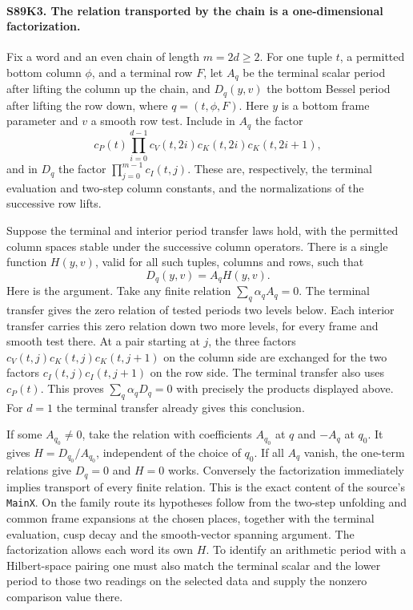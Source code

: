 \paragraph{S89K3. The relation transported by the chain is a one-dimensional factorization.}
Fix a word and an even chain of length $m=2d\ge2$. For one tuple
$t$, a permitted bottom column $\phi$, and a terminal row $F$, let
$A_q$ be the terminal scalar period after lifting the column up the
chain, and $D_q(y,v)$ the bottom Bessel period after lifting the row
down, where $q=(t,\phi,F)$. Here $y$ is a bottom frame parameter
and $v$ a smooth row test. Include in $A_q$ the factor
\[
 c_P(t)\prod_{i=0}^{d-1}
 c_V(t,2i)c_K(t,2i)c_K(t,2i+1),
\]
and in $D_q$ the factor $\prod_{j=0}^{m-1}c_I(t,j)$. These are,
respectively, the terminal evaluation and two-step column constants,
and the normalizations of the successive row lifts.

Suppose the terminal and interior period transfer laws hold, with
the permitted column spaces stable under the successive column
operators. There is a single function $H(y,v)$, valid for all such
tuples, columns and rows, such that
\[
                         D_q(y,v)=A_q H(y,v).
\]
Here is the argument. Take any finite relation
$\sum_q\alpha_q A_q=0$. The terminal transfer gives the zero
relation of tested periods two levels below. Each interior transfer
carries this zero relation down two more levels, for every frame
and smooth test there. At a pair starting at $j$, the three factors
$c_V(t,j)c_K(t,j)c_K(t,j+1)$ on the column side are exchanged
for the two factors $c_I(t,j)c_I(t,j+1)$ on the row side. The
terminal transfer also uses $c_P(t)$. This proves
$\sum_q\alpha_q D_q=0$ with precisely the products displayed above. For $d=1$ the terminal transfer already gives this conclusion.

If some $A_{q_0}\ne0$, take the relation with coefficients
$A_{q_0}$ at $q$ and $-A_q$ at $q_0$. It gives
$H=D_{q_0}/A_{q_0}$, independent of the choice of $q_0$. If all
$A_q$ vanish, the one-term relations give $D_q=0$ and $H=0$ works.
Conversely the factorization immediately implies transport of every
finite relation. This is the exact content of the source's
\texttt{MainX}. On the family route its hypotheses follow from the
two-step unfolding and common frame expansions at the chosen
places, together with the terminal evaluation, cusp decay and the
smooth-vector spanning argument. The factorization allows each word
its own $H$. To identify an arithmetic period with a Hilbert-space
pairing one must also match the terminal scalar and the lower
period to those two readings on the selected data and supply the
nonzero comparison value there.
